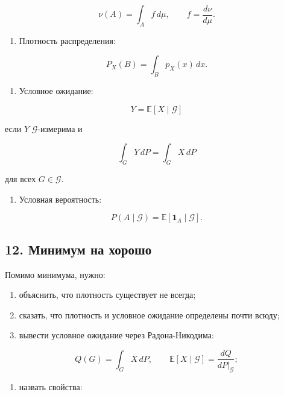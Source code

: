 \documentclass[
  11pt,
  a4paper,
]{article}
\providecommand{\tightlist}{%
  \setlength{\itemsep}{0pt}\setlength{\parskip}{0pt}}
\begin{document}
\[
\nu(A)=\int_A f\,d\mu,
\qquad
f=\frac{d\nu}{d\mu}.
\]

\begin{enumerate}
\def\labelenumi{\arabic{enumi}.}
\setcounter{enumi}{2}
\tightlist
\item
  Плотность распределения:
\end{enumerate}

\[
P_X(B)=\int_Bp_X(x)\,dx.
\]

\begin{enumerate}
\def\labelenumi{\arabic{enumi}.}
\setcounter{enumi}{3}
\tightlist
\item
  Условное ожидание:
\end{enumerate}

\[
Y=\mathbb E[X\mid\mathcal G]
\]

если \(Y\) \(\mathcal G\)-измерима и

\[
\int_GY\,dP=\int_GX\,dP
\]

для всех \(G\in\mathcal G\).

\begin{enumerate}
\def\labelenumi{\arabic{enumi}.}
\setcounter{enumi}{4}
\tightlist
\item
  Условная вероятность:
\end{enumerate}

\[
P(A\mid\mathcal G)=\mathbb E[\mathbf 1_A\mid\mathcal G].
\]

\subsection{12. Минимум на
хорошо}\label{ux43cux438ux43dux438ux43cux443ux43c-ux43dux430-ux445ux43eux440ux43eux448ux43e}

Помимо минимума, нужно:

\begin{enumerate}
\def\labelenumi{\arabic{enumi}.}
\tightlist
\item
  объяснить, что плотность существует не всегда;
\item
  сказать, что плотность и условное ожидание определены почти всюду;
\item
  вывести условное ожидание через Радона-Никодима:
\end{enumerate}

\[
Q(G)=\int_GX\,dP,
\qquad
\mathbb E[X\mid\mathcal G]=\frac{dQ}{dP|_{\mathcal G}};
\]

\begin{enumerate}
\def\labelenumi{\arabic{enumi}.}
\setcounter{enumi}{3}
\tightlist
\item
  назвать свойства:
\end{enumerate}
\end{document}
